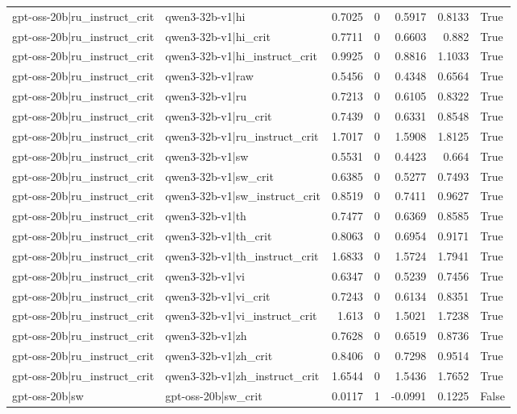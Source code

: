 \begin{table}
\begin{tabular}{l l r r r r l}
gpt-oss-20b|ru_instruct_crit & qwen3-32b-v1|hi & 0.7025 & 0 & 0.5917 & 0.8133 & True \\
gpt-oss-20b|ru_instruct_crit & qwen3-32b-v1|hi_crit & 0.7711 & 0 & 0.6603 & 0.882 & True \\
gpt-oss-20b|ru_instruct_crit & qwen3-32b-v1|hi_instruct_crit & 0.9925 & 0 & 0.8816 & 1.1033 & True \\
gpt-oss-20b|ru_instruct_crit & qwen3-32b-v1|raw & 0.5456 & 0 & 0.4348 & 0.6564 & True \\
gpt-oss-20b|ru_instruct_crit & qwen3-32b-v1|ru & 0.7213 & 0 & 0.6105 & 0.8322 & True \\
gpt-oss-20b|ru_instruct_crit & qwen3-32b-v1|ru_crit & 0.7439 & 0 & 0.6331 & 0.8548 & True \\
gpt-oss-20b|ru_instruct_crit & qwen3-32b-v1|ru_instruct_crit & 1.7017 & 0 & 1.5908 & 1.8125 & True \\
gpt-oss-20b|ru_instruct_crit & qwen3-32b-v1|sw & 0.5531 & 0 & 0.4423 & 0.664 & True \\
gpt-oss-20b|ru_instruct_crit & qwen3-32b-v1|sw_crit & 0.6385 & 0 & 0.5277 & 0.7493 & True \\
gpt-oss-20b|ru_instruct_crit & qwen3-32b-v1|sw_instruct_crit & 0.8519 & 0 & 0.7411 & 0.9627 & True \\
gpt-oss-20b|ru_instruct_crit & qwen3-32b-v1|th & 0.7477 & 0 & 0.6369 & 0.8585 & True \\
gpt-oss-20b|ru_instruct_crit & qwen3-32b-v1|th_crit & 0.8063 & 0 & 0.6954 & 0.9171 & True \\
gpt-oss-20b|ru_instruct_crit & qwen3-32b-v1|th_instruct_crit & 1.6833 & 0 & 1.5724 & 1.7941 & True \\
gpt-oss-20b|ru_instruct_crit & qwen3-32b-v1|vi & 0.6347 & 0 & 0.5239 & 0.7456 & True \\
gpt-oss-20b|ru_instruct_crit & qwen3-32b-v1|vi_crit & 0.7243 & 0 & 0.6134 & 0.8351 & True \\
gpt-oss-20b|ru_instruct_crit & qwen3-32b-v1|vi_instruct_crit & 1.613 & 0 & 1.5021 & 1.7238 & True \\
gpt-oss-20b|ru_instruct_crit & qwen3-32b-v1|zh & 0.7628 & 0 & 0.6519 & 0.8736 & True \\
gpt-oss-20b|ru_instruct_crit & qwen3-32b-v1|zh_crit & 0.8406 & 0 & 0.7298 & 0.9514 & True \\
gpt-oss-20b|ru_instruct_crit & qwen3-32b-v1|zh_instruct_crit & 1.6544 & 0 & 1.5436 & 1.7652 & True \\
gpt-oss-20b|sw & gpt-oss-20b|sw_crit & 0.0117 & 1 & -0.0991 & 0.1225 & False \\

\end{tabular}
\end{table}
